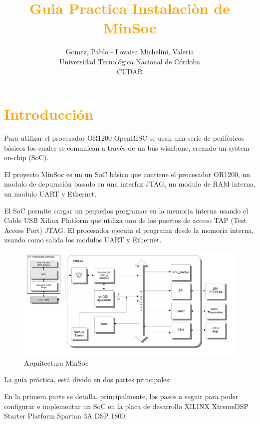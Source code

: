 \documentclass[a4paper,11pt]{article}
\title{\textcolor{orange}{Guia Practica Instalaciòn de MinSoc}}
\author{Gomez, Pablo - Lovaisa Michelini, Valeria  \\ Universidad Tecnológica Nacional de Córdoba \\ CUDAR }
\begin{document}

\maketitle 
\newpage

\tableofcontents


\newpage

\section{\textcolor{orange}{Introducción}}

Para utilizar el procesador OR1200 OpenRISC se usan una serie de periféricos básicos los cuales se comunican a través de un bus wishbone, creando un system-on-chip (SoC). 

El proyecto MinSoc es un un SoC básico que  contiene el procesador OR1200, un modulo de depuración basado en una interfaz JTAG, un modulo de RAM  interna, un modulo UART y Ethernet.

El SoC permite cargar un pequeños programas en la memoria interna usando el Cable USB  Xilinx Platform que utiliza uno de los puertos de acceso TAP (Test Access Port) JTAG. El procesador ejecuta el programa desde la memoria interna, usando como salida los modulos UART y Ethernet. 

\begin{figure}[h!]
 \begin{center}
  \includegraphics[width=1\textwidth,keepaspectratio=true]{./images/minsoc}
  \caption{Arquitectura MinSoc}
  \label{fig:esquema}
 \end{center}
\end{figure}

La guía práctica, está divida en dos partes principales: 

En la primera parte se detalla, principalmente, los pasos a seguir para poder configurar e implementar un SoC en la placa de desarrollo XILINX XtremeDSP Starter Platform Spartan 3A DSP 1800.
\end{document}
